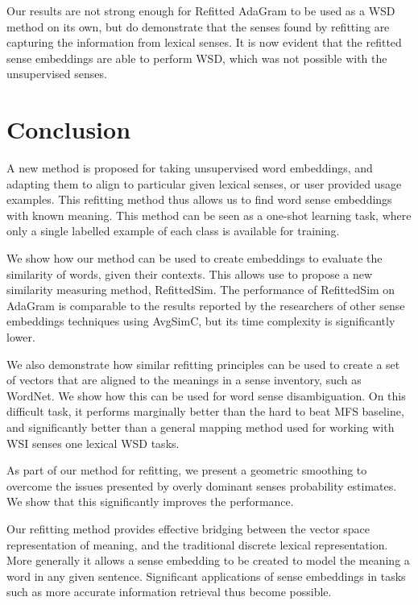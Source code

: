 \documentclass{article}
\begin{document}
Our results are not strong enough for Refitted AdaGram to be used as a WSD method on its own, but do demonstrate that the senses found by refitting are capturing the information from lexical senses.
It is now evident that the refitted sense embeddings are able to perform WSD, which was not possible with the unsupervised senses. 

\section{Conclusion}\label{conclusion}

A new method is proposed for taking unsupervised word embeddings, and adapting them to align to particular given lexical senses, or user provided usage examples. 
This refitting method thus allows us to find word sense embeddings with known meaning.
This method can be seen as a one-shot learning task, where only a single labelled example of each class is available for training.

We show how our method can be used to create embeddings to evaluate the similarity of words, given their contexts.
This allows use to propose a new similarity measuring method, RefittedSim.
The performance of RefittedSim on AdaGram is comparable to the results reported by the researchers of other sense embeddings techniques using AvgSimC, but its time complexity is significantly lower.

We also demonstrate how similar refitting principles can be used to create a set of vectors that are aligned to the meanings in a sense inventory, such as WordNet.
We show how this can be used for word sense disambiguation.
On this difficult task, it performs marginally better than the hard to beat MFS baseline, and significantly better than a general mapping method used for working with WSI senses one lexical WSD tasks.

As part of our method for refitting, we present a geometric smoothing to overcome the issues presented by overly dominant senses probability estimates.
We show that this significantly improves the performance.

Our refitting method provides effective bridging between the vector space representation of meaning, and the traditional discrete lexical representation.
More generally it allows a sense embedding to be created to model the meaning a word in any given sentence.
Significant applications  of sense embeddings in tasks such as more accurate information retrieval thus become possible.


\clearpage
{}


\end{document}
